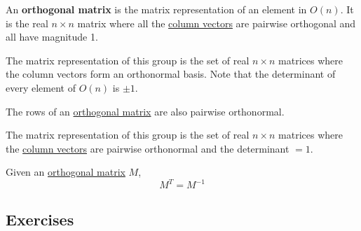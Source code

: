   \begin{definition}
    \label{def:orthogonal-matrix}
    An \textbf{orthogonal matrix} is the matrix representation of an element in $O(n)$. It is the real $n \times n$ matrix where all the \hyperref[def:column-vector]{column vectors} are pairwise orthogonal and all have magnitude 1. 

		The matrix representation of this group is the set of real $n \times n$ matrices where the column vectors form an orthonormal basis. Note that the determinant of every element of $O(n)$ is $\pm 1$. 
  \end{definition}

  \begin{theorem}
    \label{thm:rows-of-an-orthogonal-matrix-are-orthonormal}
    The rows of an \hyperref[def:orthogonal-matrix]{orthogonal matrix} are also pairwise orthonormal.
  \end{theorem}

	\begin{definition}
	  \label{def:special-orthogonal-matrix}
	  The matrix representation of this group is the set of real $n \times n$ matrices where the \hyperref[def:column-vector]{column vectors} are pairwise orthonormal and the determinant $=1$. 
	\end{definition}

  \begin{theorem}
    \label{thm:transpose-of-an-orthogonal-matrix-is-its-inverse}
    Given an \hyperref[def:orthogonal-matrix]{orthogonal matrix} $M$,
    \begin{equation}
      M^T = M^{-1}
    \end{equation}
  \end{theorem}

\subsection{Exercises} 

